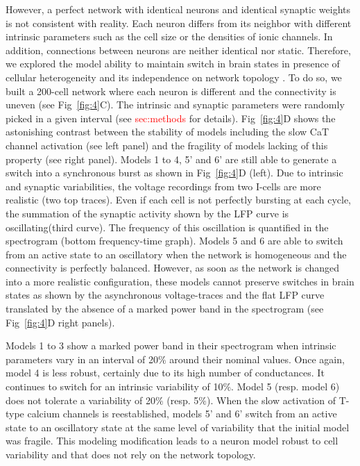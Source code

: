However, a perfect network with identical neurons and identical synaptic weights is not consistent with reality. Each neuron differs from its neighbor with different intrinsic parameters such as the cell size or the densities of ionic channels. In addition, connections between neurons are neither identical nor static. Therefore, we explored the model ability to maintain switch in brain states in presence of cellular heterogeneity and its independence on network topology \citep{drion_switchable_2018, drion_cellular_2019}. To do so, we built a 200-cell network where each neuron is different and the connectivity is uneven (see Fig~\ref{fig:4}C). The intrinsic and synaptic parameters were randomly picked in a given interval (see \textcolor{red}{sec:methods} for details). Fig~\ref{fig:4}D shows the astonishing contrast between the stability of models including the slow CaT channel activation (see left panel) and the fragility of  models lacking of this property (see right panel). Models 1 to 4, 5' and 6' are still able to generate a switch into a synchronous burst as shown in Fig~\ref{fig:4}D (left). Due to intrinsic and synaptic variabilities, the voltage recordings from two I-cells are more realistic (two top traces). Even if each cell is not perfectly bursting at each cycle, the summation of the synaptic activity shown by the LFP curve is oscillating(third curve). The frequency of this oscillation is quantified in the spectrogram (bottom frequency-time graph).  
Models 5 and 6 are able to switch from an active state to an oscillatory when the network is homogeneous and the connectivity is perfectly balanced. However, as soon as the network is changed into a more realistic configuration, these models cannot preserve switches in brain states as shown by the asynchronous voltage-traces and the flat LFP curve translated by the absence of a marked power band in the spectrogram (see Fig~\ref{fig:4}D right panels). 

Models 1 to 3 show a marked power band in their spectrogram when intrinsic parameters vary in an interval  of 20$\%$ around their nominal values. Once again, model 4 is  less robust, certainly due to its high number of conductances. It continues to switch for an intrinsic variability of 10$\%$. Model 5 (resp. model 6)  does not tolerate a variability of 20$\%$ (resp. 5$\%$).  When the slow activation of T-type calcium channels is reestablished, models 5' and 6' switch from an active state to an oscillatory state at the same level of variability that the initial model was fragile. This modeling modification leads to a neuron model robust to cell variability and that does not rely on the network topology. \\

